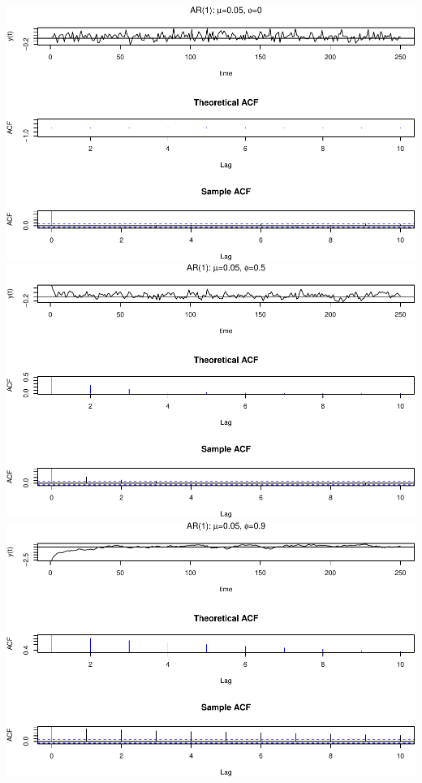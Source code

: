 \documentclass[]{article}
\begin{document}
\includegraphics{homework_4_markdown_files/figure-latex/unnamed-chunk-3-1.pdf}
\includegraphics{homework_4_markdown_files/figure-latex/unnamed-chunk-3-2.pdf}
\includegraphics{homework_4_markdown_files/figure-latex/unnamed-chunk-3-3.pdf}
\end{document}
